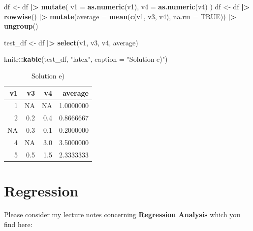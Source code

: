 \documentclass[
  doc]{apa6}
\newenvironment{Shaded}{\begin{snugshade}}{\end{snugshade}}
\newcommand{\AttributeTok}[1]{\textcolor[rgb]{0.13,0.29,0.53}{#1}}
\newcommand{\ConstantTok}[1]{\textcolor[rgb]{0.56,0.35,0.01}{#1}}
\newcommand{\FunctionTok}[1]{\textcolor[rgb]{0.13,0.29,0.53}{\textbf{#1}}}
\newcommand{\NormalTok}[1]{#1}
\newcommand{\OtherTok}[1]{\textcolor[rgb]{0.56,0.35,0.01}{#1}}
\newcommand{\SpecialCharTok}[1]{\textcolor[rgb]{0.81,0.36,0.00}{\textbf{#1}}}
\newcommand{\StringTok}[1]{\textcolor[rgb]{0.31,0.60,0.02}{#1}}
\begin{document}
\newpage

\begin{Shaded}
\begin{Highlighting}[]
\NormalTok{df }\OtherTok{\textless{}{-}}\NormalTok{ df }\SpecialCharTok{|\textgreater{}} 
  \FunctionTok{mutate}\NormalTok{(}
    \AttributeTok{v1 =} \FunctionTok{as.numeric}\NormalTok{(v1),}
    \AttributeTok{v4 =} \FunctionTok{as.numeric}\NormalTok{(v4)}
\NormalTok{  )}
\NormalTok{df }\OtherTok{\textless{}{-}}\NormalTok{ df }\SpecialCharTok{|\textgreater{}} 
  \FunctionTok{rowwise}\NormalTok{() }\SpecialCharTok{|\textgreater{}} 
  \FunctionTok{mutate}\NormalTok{(}\AttributeTok{average =} \FunctionTok{mean}\NormalTok{(}\FunctionTok{c}\NormalTok{(v1, v3, v4), }\AttributeTok{na.rm =} \ConstantTok{TRUE}\NormalTok{)) }\SpecialCharTok{|\textgreater{}} 
  \FunctionTok{ungroup}\NormalTok{()}

\NormalTok{test\_df }\OtherTok{\textless{}{-}}\NormalTok{ df }\SpecialCharTok{|\textgreater{}} 
  \FunctionTok{select}\NormalTok{(v1, v3, v4, average)}

\NormalTok{knitr}\SpecialCharTok{::}\FunctionTok{kable}\NormalTok{(test\_df, }\StringTok{"latex"}\NormalTok{, }\AttributeTok{caption =} \StringTok{"Solution e)"}\NormalTok{)}
\end{Highlighting}
\end{Shaded}

\begin{table}

\caption{\label{tab:unnamed-chunk-6}Solution e)}
\centering
\begin{tabular}[t]{r|r|r|r}
\hline
v1 & v3 & v4 & average\\
\hline
1 & NA & NA & 1.0000000\\
\hline
2 & 0.2 & 0.4 & 0.8666667\\
\hline
NA & 0.3 & 0.1 & 0.2000000\\
\hline
4 & NA & 3.0 & 3.5000000\\
\hline
5 & 0.5 & 1.5 & 2.3333333\\
\hline
\end{tabular}
\end{table}

\newpage

\section{Regression}\label{regression}

Please consider my lecture notes concerning \textbf{Regression Analysis} which you find here:
\end{document}
